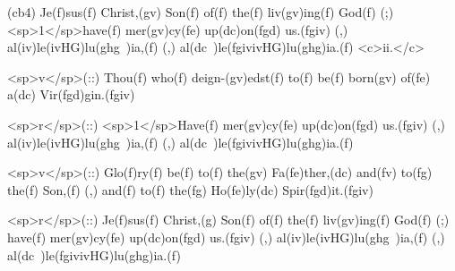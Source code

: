 (cb4) Je(f)sus(f) Christ,(gv) Son(f) of(f) the(f) liv(gv)ing(f) God(f) (;) <sp>1</sp>have(f) mer(gv)cy(fe) up(dc)on(fgd) us.(fgiv) (,) al(iv)le(ivHG)lu(ghg~)ia,(f) (,) al(dc~)le(fgivivHG)lu(ghg)ia.(f) <c>ii.</c>

<sp>v</sp>(::) Thou(f) who(f) deign-(gv)edst(f) to(f) be(f) born(gv) of(fe) a(dc) Vir(fgd)gin.(fgiv)

<sp>r</sp>(::) <sp>1</sp>Have(f) mer(gv)cy(fe) up(dc)on(fgd) us.(fgiv) (,) al(iv)le(ivHG)lu(ghg~)ia,(f) (,) al(dc~)le(fgivivHG)lu(ghg)ia.(f)

<sp>v</sp>(::) Glo(f)ry(f) be(f) to(f) the(gv) Fa(fe)ther,(dc) and(fv) to(fg) the(f) Son,(f) (,) and(f) to(f) the(fg) Ho(fe)ly(dc) Spir(fgd)it.(fgiv) 

<sp>r</sp>(::) Je(f)sus(f) Christ,(g) Son(f) of(f) the(f) liv(gv)ing(f) God(f) (;) have(f) mer(gv)cy(fe) up(dc)on(fgd) us.(fgiv) (,) al(iv)le(ivHG)lu(ghg~)ia,(f) (,) al(dc~)le(fgivivHG)lu(ghg)ia.(f)